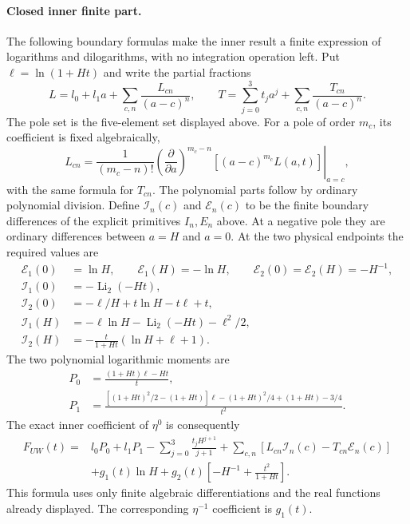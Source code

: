 \paragraph{Closed inner finite part.} The following boundary formulas
make the inner result a finite expression of logarithms and
dilogarithms, with no integration operation left. Put
$\ell=\ln(1+Ht)$ and write the partial fractions
\begin{equation}
 L=l_0+l_1a+\sum_{c,n}\frac{L_{cn}}{(a-c)^n},\qquad
 T=\sum_{j=0}^3t_j a^j+\sum_{c,n}\frac{T_{cn}}{(a-c)^n}.
\end{equation}
The pole set is the five-element set displayed above.
For a pole of order $m_c$, its coefficient is fixed algebraically,
\begin{equation}
 L_{cn}=\left.\frac1{(m_c-n)!}
  \left(\frac{\partial}{\partial a}\right)^{m_c-n}
       [(a-c)^{m_c}L(a,t)]\right|_{a=c},
\end{equation}
with the same formula for $T_{cn}$. The polynomial parts follow by
ordinary polynomial division. Define $\mathcal I_n(c)$ and
$\mathcal E_n(c)$ to be the finite boundary differences of the
explicit primitives $I_n,E_n$ above. At a negative pole they are
ordinary differences between $a=H$ and $a=0$. At the two physical
endpoints the required values are
\begin{align}
 \mathcal E_1(0)&=\ln H,\qquad
 \mathcal E_1(H)=-\ln H,\qquad
 \mathcal E_2(0)=\mathcal E_2(H)=-H^{-1},\\
 \mathcal I_1(0)&=-\operatorname{Li}_2(-Ht),\\
 \mathcal I_2(0)&=-\ell/H+t\ln H-t\ell+t,\\
 \mathcal I_1(H)&=-\ell\ln H-\operatorname{Li}_2(-Ht)-\ell^2/2,\\
 \mathcal I_2(H)&=-\frac{t}{1+Ht}(\ln H+\ell+1).
\end{align}
The two polynomial logarithmic moments are
\begin{align}
 P_0&=\frac{(1+Ht)\ell-Ht}{t},\\
 P_1&=\frac{[(1+Ht)^2/2-(1+Ht)]\ell
              -(1+Ht)^2/4+(1+Ht)-3/4}{t^2}.
\end{align}
The exact inner coefficient of $\eta^0$ is consequently
\begin{align}
 F_{UW}(t)={}&l_0P_0+l_1P_1
       -\sum_{j=0}^3\frac{t_jH^{j+1}}{j+1}
       +\sum_{c,n}[L_{cn}\mathcal I_n(c)-T_{cn}\mathcal E_n(c)]\\
 &+g_1(t)\ln H+g_2(t)\left[-H^{-1}+\frac{t^2}{1+Ht}\right].
 \label{eq:comp-real-UW-inner-closed}
\end{align}
This formula uses only finite algebraic differentiations and the
real functions already displayed. The corresponding $\eta^{-1}$
coefficient is $g_1(t)$.

